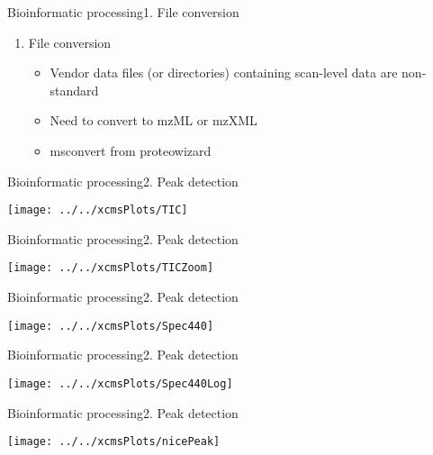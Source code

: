 \documentclass[xcolor=dvipsnames]{beamer}
\begin{document}
\begin{frame}{Bioinformatic processing}{1. File conversion}
\vspace{-10pt}
	\begin{enumerate}
 [default]
		\item File conversion
		\begin{itemize}
			\item Vendor data files (or directories) containing scan-level data are non-standard
			\item Need to convert to mzML or mzXML
			\item msconvert from proteowizard
		\end{itemize}
	\end{enumerate}
\end{frame}

\begin{frame}{Bioinformatic processing}{2. Peak detection}
\vspace{-7pt}
\begin{center}
	\texttt{[image: ../../xcmsPlots/TIC]}
\end{center}
\end{frame}

\begin{frame}{Bioinformatic processing}{2. Peak detection}
\vspace{-7pt}
\begin{center}
	\texttt{[image: ../../xcmsPlots/TICZoom]}
\end{center}
\end{frame}

\begin{frame}{Bioinformatic processing}{2. Peak detection}
\vspace{-10pt}
\begin{center}
	\texttt{[image: ../../xcmsPlots/Spec440]}
\end{center}
\end{frame}

\begin{frame}{Bioinformatic processing}{2. Peak detection}
\vspace{-10pt}
\begin{center}
	\texttt{[image: ../../xcmsPlots/Spec440Log]}
\end{center}
\end{frame}

\begin{frame}{Bioinformatic processing}{2. Peak detection}
\vspace{-10pt}
\begin{center}
	\texttt{[image: ../../xcmsPlots/nicePeak]}
\end{center}
\end{frame}
\end{document}
